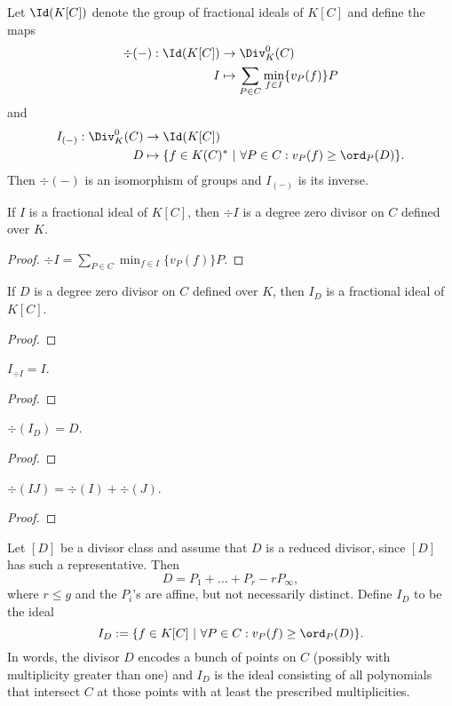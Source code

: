 \begin{theorem}
  Let $\Id(K[C])$ denote the group of fractional ideals of $K[C]$ and define the maps
  \begin{align*}
    \div(-) : \Id(K[C]) &\to \Div_K^0(C) \\
    I &\mapsto \sum_{P \in C} \min_{f \in I}\{v_P(f)\}P
  \end{align*}
  and
  \begin{align*}
    I_{(-)} : \Div_K^0(C) &\to \Id(K[C]) \\
    D &\mapsto \{ f \in K(C)^* ~|~ \forall P \in C : v_P(f) \geq \ord_P(D) \}.
  \end{align*}
  Then $\div(-)$ is an isomorphism of groups and $I_{(-)}$ is its inverse.
\end{theorem}
\begin{lemma}
  If $I$ is a fractional ideal of $K[C]$, then $\div I$ is a degree zero divisor on $C$ defined over $K$.
\end{lemma}
\begin{proof}
  $\div I = \sum_{P \in C} \min_{f \in I}\{v_P(f)\}P$.
\end{proof}
\begin{lemma}
  If $D$ is a degree zero divisor on $C$ defined over $K$,
  then $I_D$ is a fractional ideal of $K[C]$.
\end{lemma}
\begin{proof}
\end{proof}
\begin{lemma}
  $I_{\div I} = I$.
\end{lemma}
\begin{proof}
\end{proof}
\begin{lemma}
  $\div(I_D) = D$.
\end{lemma}
\begin{proof}
\end{proof}
\begin{lemma}
  $\div(IJ) = \div(I) + \div(J)$.
\end{lemma}
\begin{proof}
\end{proof}

Let $[D]$ be a divisor class and assume that $D$ is a reduced divisor, since $[D]$ has such a representative.
Then
  \[ D = P_1 + \dots + P_r - rP_\infty, \]
where $r \leq g$  and the $P_i$'s are affine, but not necessarily distinct.
Define $I_D$ to be the ideal
  \[ I_D := \{ f \in K[C] ~|~ \forall P \in C : v_P(f) \geq \ord_P(D) \}. \]
In words, the divisor $D$ encodes a bunch of points on $C$ (possibly with multiplicity greater than one)
and $I_D$ is the ideal consisting of all polynomials that intersect $C$ at those points with at least the prescribed multiplicities.

